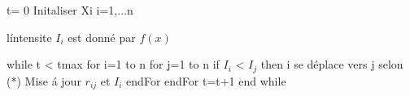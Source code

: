 \begin{filecontents}
t= 0
Initaliser Xi i=1,...n

l\'intensite $I_i$ est donn\'e par $f(x)$

while t < tmax
	for i=1 to n
		for j=1 to n
			if $I_i$ < $I_j$ then
			i se d\'eplace vers j selon (*)
			Mise \'a jour $r_{ij}$ et $I_i$
		endFor
	endFor
	t=t+1
end while


\end{filecontents}

